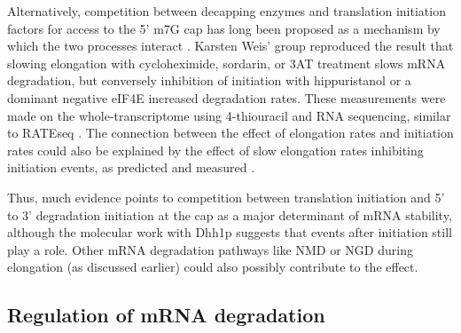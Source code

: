 Alternatively, competition between
decapping enzymes and translation initiation factors for access to the
5' m7G cap has long been proposed as a mechanism by which the two
processes interact 
\parencite{schwartz1999mutations,schwartz2000mrna}. Karsten Weis' group 
\parencite{chan2017non} reproduced the result
that slowing elongation with cycloheximide, sordarin, or 3AT treatment
slows mRNA degradation, but conversely inhibition of initiation with
hippuristanol or a dominant negative eIF4E increased degradation
rates. These measurements were made on the whole-transcriptome using
4-thiouracil and RNA sequencing, similar to RATEseq 
\parencite{neymotin2014determination}. 
The connection between the effect of elongation rates and
initiation rates could also be explained by the effect of slow
elongation rates inhibiting initiation events, as predicted 
\parencite{shah2013rate} and measured \parencite{chu2014translation}.

Thus, much evidence points
to competition between translation initiation and 5' to 3' degradation
initiation at the cap as a major determinant of mRNA stability,
although the molecular work with Dhh1p suggests that events after
initiation still play a role. Other mRNA degradation pathways like NMD
or NGD during elongation (as discussed earlier) could also possibly
contribute to the effect.  

\subsection{ Regulation of mRNA degradation }

